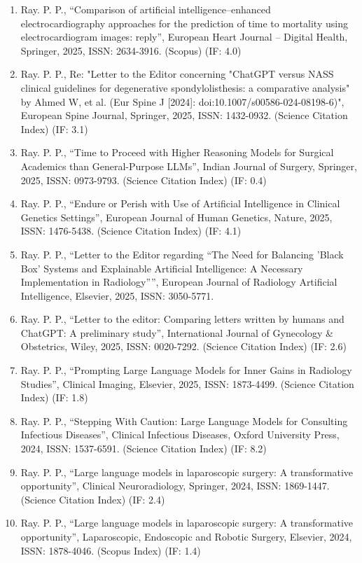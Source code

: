 \documentclass[11pt,a4paper]{moderncv}
\begin{document}
\begin{adjustwidth}{6em}{0pt}
\begin{enumerate}
		\item Ray. P. P., “Comparison of artificial intelligence–enhanced electrocardiography approaches for the prediction of time to mortality using electrocardiogram images: reply”, European Heart Journal – Digital Health, Springer, 2025, ISSN: 2634-3916. (Scopus) (IF: 4.0)
		\item Ray. P. P., Re: "Letter to the Editor concerning "ChatGPT versus NASS clinical guidelines for degenerative spondylolisthesis: a comparative analysis" by Ahmed W, et al. (Eur Spine J [2024]: doi:10.1007/s00586-024-08198-6)", European Spine Journal, Springer, 2025, ISSN: 1432-0932. (Science Citation Index) (IF: 3.1)
		\item Ray. P. P., “Time to Proceed with Higher Reasoning Models for Surgical Academics than General-Purpose LLMs”, Indian Journal of Surgery, Springer, 2025, ISSN: 0973-9793. (Science Citation Index) (IF: 0.4)
		\item Ray. P. P., “Endure or Perish with Use of Artificial Intelligence in Clinical Genetics Settings”, European Journal of Human Genetics, Nature, 2025, ISSN: 1476-5438. (Science Citation Index) (IF: 4.1)
		\item Ray. P. P., “Letter to the Editor regarding “The Need for Balancing 'Black Box' Systems and Explainable Artificial Intelligence: A Necessary Implementation in Radiology””, European Journal of Radiology Artificial Intelligence, Elsevier, 2025, ISSN: 3050-5771.
		\item Ray. P. P., “Letter to the editor: Comparing letters written by humans and ChatGPT: A preliminary study”, International Journal of Gynecology \& Obstetrics, Wiley, 2025, ISSN: 0020-7292. (Science Citation Index) (IF: 2.6)
		\item Ray. P. P., “Prompting Large Language Models for Inner Gains in Radiology Studies”, Clinical Imaging, Elsevier, 2025, ISSN: 1873-4499. (Science Citation Index) (IF: 1.8)
		\item Ray. P. P., “Stepping With Caution: Large Language Models for Consulting Infectious Diseases”, Clinical Infectious Diseases, Oxford University Press, 2024, ISSN: 1537-6591. (Science Citation Index) (IF: 8.2)
		\item Ray. P. P., “Large language models in laparoscopic surgery: A transformative opportunity”, Clinical Neuroradiology, Springer, 2024, ISSN: 1869-1447. (Science Citation Index) (IF: 2.4)
		\item Ray. P. P., “Large language models in laparoscopic surgery: A transformative opportunity”, Laparoscopic, Endoscopic and Robotic Surgery, Elsevier, 2024, ISSN: 1878-4046. (Scopus Index) (IF: 1.4)

\end{enumerate}
\end{adjustwidth}
\end{document}
